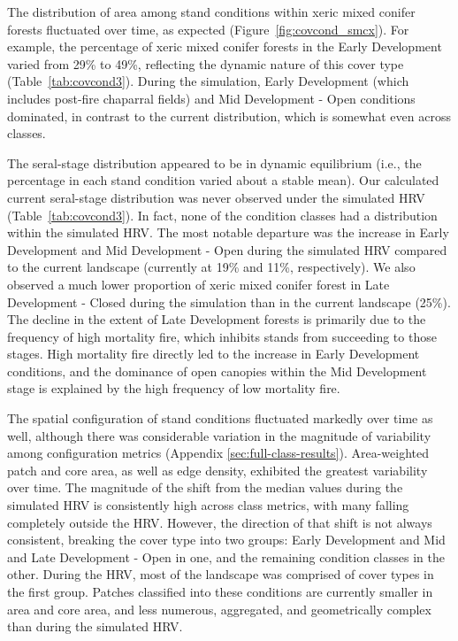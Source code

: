 The distribution of area among stand conditions within xeric mixed conifer forests fluctuated over time, as expected (Figure~\ref{fig:covcond_smcx}). For example, the percentage of xeric mixed conifer forests in the Early Development varied from 29\% to 49\%, reflecting the dynamic nature of this cover type (Table~\ref{tab:covcond3}). During the simulation, Early Development (which includes post-fire chaparral fields) and Mid Development - Open conditions dominated, in contrast to the current distribution, which is somewhat even across classes. 

The seral-stage distribution appeared to be in dynamic equilibrium (i.e., the percentage in each stand condition varied about a stable mean). Our calculated current seral-stage distribution was never observed under the simulated HRV (Table~\ref{tab:covcond3}). In fact, none of the condition classes had a distribution within the simulated HRV. The most notable departure was the increase in Early Development and Mid Development - Open during the simulated HRV compared to the current landscape (currently at 19\% and 11\%, respectively). We also observed a much lower proportion of xeric mixed conifer forest in Late Development - Closed during the simulation than in the current landscape (25\%). The decline in the extent of Late Development forests is primarily due to the frequency of high mortality fire, which inhibits stands from succeeding to those stages. High mortality fire directly led to the increase in Early Development conditions, and the dominance of open canopies within the Mid Development stage is explained by the high frequency of low mortality fire.

The spatial configuration of stand conditions fluctuated markedly over time as well, although there was considerable variation in the magnitude of variability among configuration metrics (Appendix \ref{sec:full-class-results}). Area-weighted patch and core area, as well as edge density, exhibited the greatest variability over time. The magnitude of the shift from the median values during the simulated HRV is consistently high across class metrics, with many falling completely outside the HRV. However, the direction of that shift is not always consistent, breaking the cover type into two groups: Early Development and Mid and Late Development - Open in one, and the remaining condition classes in the other. During the HRV, most of the landscape was comprised of cover types in the first group. Patches classified into these conditions are currently smaller in area and core area, and less numerous, aggregated, and geometrically complex than during the simulated HRV.



